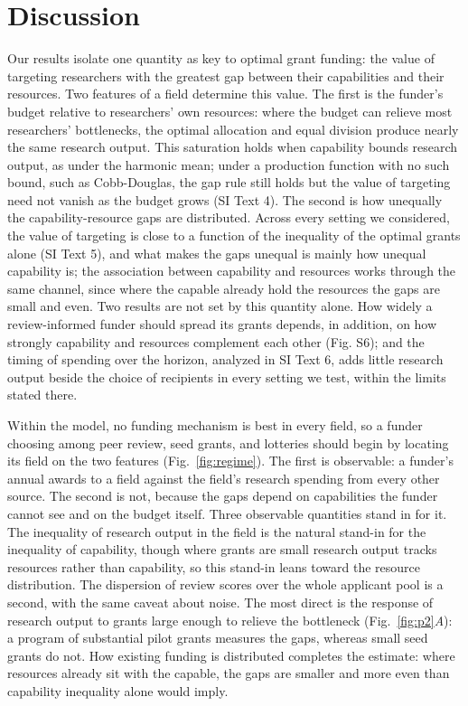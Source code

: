 \documentclass[9pt,twocolumn,twoside]{pnas-new}
\begin{document}
\section*{Discussion}
Our results isolate one quantity as key to optimal grant funding: the value of targeting researchers with the greatest gap between their capabilities and their resources. Two features of a field determine this value. The first is the funder's budget relative to researchers' own resources: where the budget can relieve most researchers' bottlenecks, the optimal allocation and equal division produce nearly the same research output. This saturation holds when capability bounds research output, as under the harmonic mean; under a production function with no such bound, such as Cobb-Douglas, the gap rule still holds but the value of targeting need not vanish as the budget grows (SI Text 4). The second is how unequally the capability-resource gaps are distributed. Across every setting we considered, the value of targeting is close to a function of the inequality of the optimal grants alone (SI Text 5), and what makes the gaps unequal is mainly how unequal capability is; the association between capability and resources works through the same channel, since where the capable already hold the resources the gaps are small and even. Two results are not set by this quantity alone. How widely a review-informed funder should spread its grants depends, in addition, on how strongly capability and resources complement each other (Fig. S6); and the timing of spending over the horizon, analyzed in SI Text 6, adds little research output beside the choice of recipients in every setting we test, within the limits stated there.

Within the model, no funding mechanism is best in every field, so a funder choosing among peer review, seed grants, and lotteries should begin by locating its field on the two features (Fig.~\ref{fig:regime}). The first is observable: a funder's annual awards to a field against the field's research spending from every other source. The second is not, because the gaps depend on capabilities the funder cannot see and on the budget itself. Three observable quantities stand in for it. The inequality of research output in the field is the natural stand-in for the inequality of capability, though where grants are small research output tracks resources rather than capability, so this stand-in leans toward the resource distribution. The dispersion of review scores over the whole applicant pool is a second, with the same caveat about noise. The most direct is the response of research output to grants large enough to relieve the bottleneck (Fig.~\ref{fig:p2}\textit{A}): a program of substantial pilot grants measures the gaps, whereas small seed grants do not. How existing funding is distributed completes the estimate: where resources already sit with the capable, the gaps are smaller and more even than capability inequality alone would imply.
\end{document}
